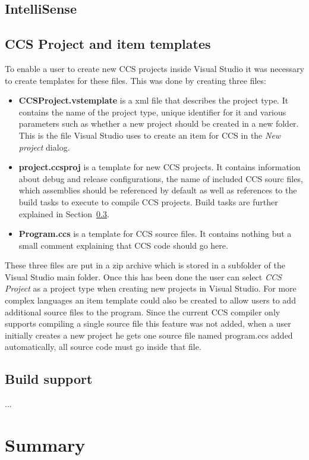 	
	\subsection{IntelliSense}

	\subsection{CCS Project and item templates}
	To enable a user to create new CCS projects inside Visual Studio it was 
	necessary to create templates for these files. This was done by creating 
	three files:
	
	\begin{itemize}
		\item \textbf{CCSProject.vstemplate} is a xml file that describes the 
		project type. It contains the name of the project type, unique identifier 
		for it and various parameters such as whether a new project should be 
		created in a new folder. This is the file Visual Studio uses to create an 
		item for CCS in the \textit{New project} dialog.
		
		\item \textbf{project.ccsproj} is a template for new CCS projects. It 
		contains information about debug and release configurations, the name of 
		included CCS sourc files, which assemblies should be referenced by default 
		as well as references to the build tasks to execute to compile CCS 
		projects. Build tasks are further explained in Section~\ref{msbuild}.
		
		\item \textbf{Program.ccs} is a template for CCS source files. It contains
		nothing but a small comment explaining that CCS code should go here. 
	
	\end{itemize}
	
	These three files are put in a zip archive which is stored in a subfolder of
	the Visual Studio main folder. Once this has been done the user can select 
	\textit{CCS Project} as a project type when creating new projects in Visual 
	Studio. For more complex languages an item template could also be created to
	allow users to add additional source files to the program. Since the current
	CCS compiler only supports compiling a single source file this feature was 
	not added, when a user initially creates a new project he gets one source 
	file named \textsf{program.ccs} added automatically, all source code must go
	inside that file.

	\subsection{Build support}\label{msbuild}
	
	...
	
	\section{Summary}
	